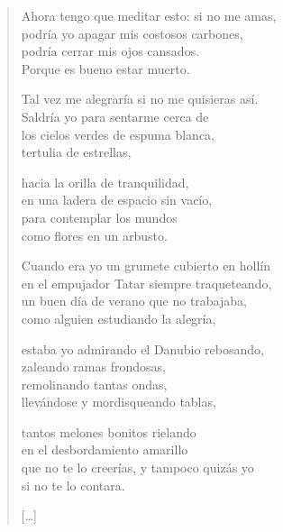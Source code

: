 \documentclass[11pt]{extbook}
\newcommand*{\centeredornament}{\centerline{\pgfornament[width=6cm]{88}}}
\begin{document}
\newpage


\vspace*{-15mm}
\centeredornament



\begin{verse}
  Ahora tengo que meditar esto: si no me amas,\hspace*{-1mm} \\
  podría yo apagar mis costosos carbones, \\
  podría cerrar mis ojos cansados. \\
  Porque es bueno estar muerto.

  Tal vez me alegraría si no me quisieras así. \\
  Saldría yo para sentarme cerca de \\
  los cielos verdes de espuma blanca, \\
  tertulia de estrellas,

  hacia la orilla de tranquilidad, \\
  en una ladera de espacio sin vacío, \\
  para contemplar los mundos \\
  como flores en un arbusto.

  Cuando era yo un grumete cubierto en hollín \\
  en el empujador Tatar siempre traqueteando,\hspace*{-1mm} \\
  un buen día de verano que no trabajaba, \\
  como alguien estudiando la alegría,

  estaba yo admirando el Danubio rebosando, \\
  zaleando ramas frondosas, \\
  remolinando tantas ondas, \\
  llevándose y mordisqueando tablas,

  tantos melones bonitos rielando \\
  en el desbordamiento amarillo \\
  que no te lo creerías, y tampoco quizás yo \\
  si no te lo contara.

  \hfill [\ldots]
\end{verse}

\newpage
\end{document}
